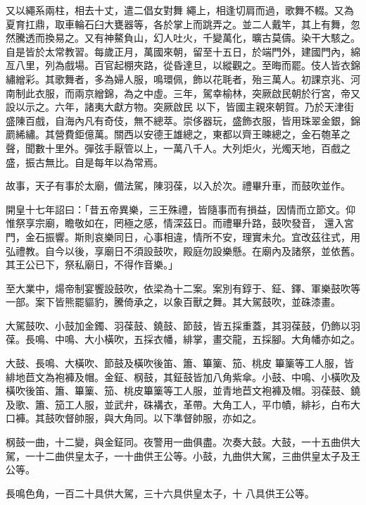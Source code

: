 \begin{pinyinscope}
 又以繩系兩柱，相去十丈，遣二倡女對舞
 繩上，相逢切肩而過，歌舞不輟。又為夏育扛鼎，取車輪石臼大甕器等，各於掌上而跳弄之。並二人戴竿，其上有舞，忽然騰透而換易之。又有神鰲負山，幻人吐火，千變萬化，曠古莫儔。染干大駭之。自是皆於太常教習。每歲正月，萬國來朝，留至十五日，於端門外，建國門內，綿亙八里，列為戲場。百官起棚夾路，從昏達旦，以縱觀之。至晦而罷。伎人皆衣錦繡繒彩。其歌舞者，多為婦人服，鳴環佩，飾以花毦者，殆三萬人。初課京兆、河南制此衣服，而兩京繒錦，為之中虛。三年，駕幸榆林，突厥啟民朝於行宮，帝又設以示之。六年，諸夷大獻方物。突厥啟民
 以下，皆國主親來朝賀。乃於天津街盛陳百戲，自海內凡有奇伎，無不總萃。崇侈器玩，盛飾衣服，皆用珠翠金銀，錦罽絺繡。其營費鉅億萬。關西以安德王雄總之，東都以齊王暕總之，金石匏革之聲，聞數十里外。彈弦手厭管以上，一萬八千人。大列炬火，光燭天地，百戲之盛，振古無比。自是每年以為常焉。



 故事，天子有事於太廟，備法駕，陳羽葆，以入於次。禮畢升車，而鼓吹並作。



 開皇十七年詔曰：「昔五帝異樂，三王殊禮，皆隨事而有損益，因情而立節文。仰惟祭享宗廟，瞻敬如在，罔極之感，情深茲日。而禮畢升路，鼓吹發音，
 還入宮門，金石振響。斯則哀樂同日，心事相違，情所不安，理實未允。宜改茲往式，用弘禮教。自今以後，享廟日不須設鼓吹，殿庭勿設樂懸。在廟內及諸祭，並依舊。其王公已下，祭私廟日，不得作音樂。」



 至大業中，煬帝制宴饗設鼓吹，依梁為十二案。案別有錞于、鉦、鐸、軍樂鼓吹等一部。案下皆熊罷貙豹，騰倚承之，以象百獸之舞。其大駕鼓吹，並硃漆畫。



 大駕鼓吹、小鼓加金鐲、羽葆鼓、鐃鼓、節鼓，皆五採重蓋，其羽葆鼓，仍飾以羽葆。長鳴、中鳴、大小橫吹，五採衣幡，緋掌，畫交龍，五採腳。大角幡亦如之。



 大鼓、長鳴、大橫吹、節鼓及橫吹後笛、簫、篳篥、笳、桃皮
 篳篥等工人服，皆緋地苣文為袍褲及帽。金鉦、㭎鼓，其鉦鼓皆加八角紫傘。小鼓、中鳴、小橫吹及橫吹後笛、簫、篳篥、笳、桃皮篳篥等工人服，並青地苣文袍褲及帽。羽葆鼓、鐃及歌、簫、笳工人服，並武弁，硃褠衣，革帶。大角工人，平巾幘，緋衫，白布大口褲。其鼓吹督帥服，與大角同。以下準督帥服，亦如之。



 㭎鼓一曲，十二變，與金鉦同。夜警用一曲俱盡。次奏大鼓。大鼓，一十五曲供大駕，一十二曲供皇太子，一十曲供王公等。小鼓，九曲供大駕，三曲供皇太子及王公等。



 長鳴色角，一百二十具供大駕，三十六具供皇太子，十
 八具供王公等。




\end{pinyinscope}

